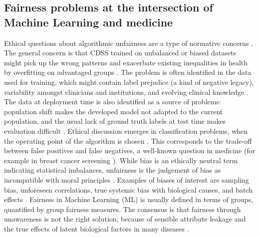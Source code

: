\subsection{Fairness problems at the intersection of Machine Learning and medicine}
    Ethical questions about algorithmic unfairness are a type of normative concerns \cite{Morley2020}.
    The general concern is that CDSS trained on unbalanced or biased datasets might pick up the wrong patterns and exacerbate existing inequalities in health by overfitting on advantaged groups \cite{Morley2020}\cite{Chen2021}.
    The problem is often identified in the data used for training, which might contain label prejudice (a kind of negative legacy), variability amongst clinicians and institutions, and evolving clinical knowledge \cite{Chen2021}.
    The data at deployment time is also identified as a source of problems: population shift makes the developed model not adapted to the current population, and the usual lack of ground truth labels at test time makes evaluation difficult \cite{Chen2021}.
    Ethical discussion emerges in classification problems, when the operating point of the algorithm is chosen \cite{Fletcher2021}.
    This corresponds to the trade-off between false positives and false negatives, a well-known question in medicine (for example in breast cancer screening \cite{Fletcher2021}).
    While bias is an ethically neutral term indicating statistical imbalances, unfairness is the judgement of bias as incompatible with moral principles \cite[p.~6]{Fletcher2021}.
    Examples of biases of interest are sampling bias, unforeseen correlations, true systemic bias with biological causes, and batch effects \cite{Fletcher2021}.
    Fairness in Machine Learning (ML) is usually defined in terms of groups, quantified by group fairness measures.
    The consensus is that fairness through unawareness is not the right solution, because of sensible attribute leakage and the true effects of latent biological factors in many diseases \cite{Chen2021}.



